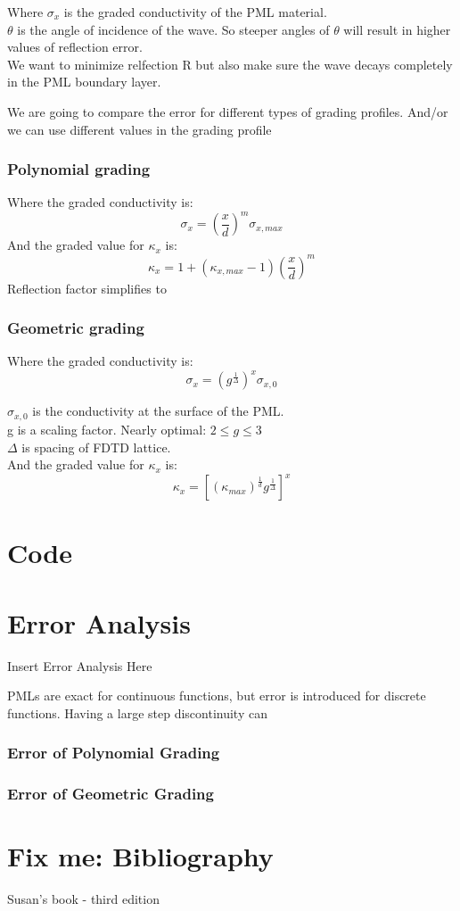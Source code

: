 \documentclass{article}
\begin{document}
  Where $\sigma_{x}$ is the graded conductivity of the PML material.\\
  $\theta$ is the angle of incidence of the wave. So steeper angles of $\theta$
  will result in higher values of reflection error.\\
We want to minimize relfection R but also make sure the wave decays completely
in the PML boundary layer.

We are going to compare the error for different types of grading profiles.
And/or we can use different values in the grading profile 

\subsubsection{Polynomial grading}
Where the graded conductivity is:
\[\sigma_{x} = (\frac{x}{d})^{m} \sigma_{x,max}\]
And the graded value for $\kappa_{x}$ is:
\[\kappa_{x}=1+(\kappa_{x,max}-1)(\frac{x}{d})^{m}\]
Reflection factor simplifies to 

\subsubsection{Geometric grading}
Where the graded conductivity is:
\[\sigma_{x} =(g^{\frac{1}{\Delta}})^{x} \sigma_{x,0}\]

$\sigma_{x,0}$ is the conductivity at the surface of the PML.\\
g is a scaling factor. Nearly optimal: $2 \leq g \leq 3$\\
$\Delta$ is spacing of FDTD lattice.\\

And the graded value for $\kappa_{x}$ is:
\[\kappa_{x}=[(\kappa_{max})^{\frac{1}{d}}g^{\frac{1}{\Delta}}]^{x}\]

\section{Code}


\section{Error Analysis}
Insert Error Analysis Here

PMLs are exact for continuous functions, but error is introduced for discrete
functions. Having a large step discontinuity can

\subsubsection{Error of Polynomial Grading}

\subsubsection{Error of Geometric Grading}

\section{Fix me: Bibliography}
Susan's book - third edition
\end{document}
